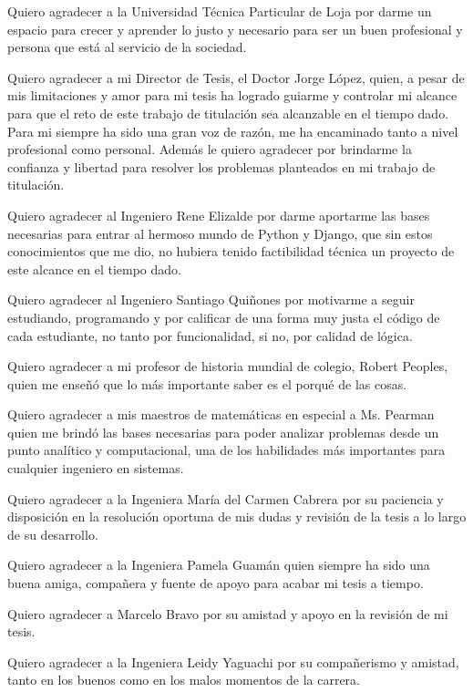 \documentclass[
11pt, %
spanish, %
singlespacing, %
headsepline, %
]{MastersDoctoralThesis} %
\begin{document}
\begin{acknowledgements}
Quiero agradecer a la Universidad Técnica Particular de Loja por darme un espacio para crecer y aprender lo justo y necesario para ser un buen profesional y persona que está al servicio de la sociedad.

Quiero agradecer a mi Director de Tesis, el Doctor Jorge López, quien, a pesar de mis limitaciones y amor para mi tesis ha logrado guiarme y controlar mi alcance para que el reto de este trabajo de titulación sea alcanzable en el tiempo dado. Para mi siempre ha sido una gran voz de razón, me ha encaminado tanto a nivel profesional como personal. Además le quiero agradecer por brindarme la confianza y libertad para resolver los problemas planteados en mi trabajo de titulación.

Quiero agradecer al Ingeniero Rene Elizalde por darme aportarme las bases necesarias para entrar al hermoso mundo de Python y Django, que sin estos conocimientos que me dio, no hubiera tenido factibilidad técnica un proyecto de este alcance en el tiempo dado.

Quiero agradecer al Ingeniero Santiago Quiñones por motivarme a seguir estudiando, programando y por calificar de una forma muy justa el código de cada estudiante, no tanto por funcionalidad, si no, por calidad de lógica.

Quiero agradecer a mi profesor de historia mundial de colegio, Robert Peoples, quien me enseñó que lo más importante saber es el porqué de las cosas.

Quiero agradecer a mis maestros de matemáticas en especial a Ms. Pearman quien me brindó las bases necesarias para poder analizar problemas desde un punto analítico y computacional, una de los habilidades más importantes para cualquier ingeniero en sistemas.

Quiero agradecer a la Ingeniera María del Carmen Cabrera por su paciencia y disposición en la resolución oportuna de mis dudas y revisión de la tesis a lo largo de su desarrollo.

Quiero agradecer a la Ingeniera Pamela Guamán quien siempre ha sido una buena amiga, compañera y fuente de apoyo para acabar mi tesis a tiempo.

Quiero agradecer a Marcelo Bravo por su amistad y apoyo en la revisión de mi tesis.

Quiero agradecer a la Ingeniera Leidy Yaguachi por su compañerismo y amistad, tanto en los buenos como en los malos momentos de la carrera.


\end{acknowledgements}
\end{document}
